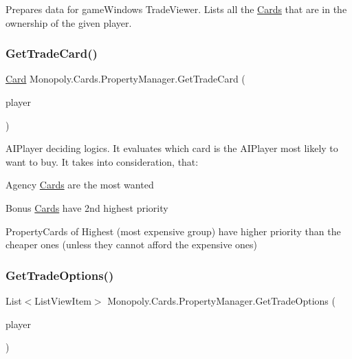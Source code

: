 Prepares data for game\+Window\textquotesingle{}s Trade\+Viewer. Lists all the \mbox{\hyperlink{namespace_monopoly_1_1_cards}{Cards}} that are in the ownership of the given player. \mbox{\label{class_monopoly_1_1_cards_1_1_property_manager_a412844ef7c911e8084dae7c3f71d37cc}} 
\subsubsection{\texorpdfstring{Get\+Trade\+Card()}{GetTradeCard()}}
{\footnotesize\ttfamily \mbox{\hyperlink{class_monopoly_1_1_cards_1_1_card}{Card}} Monopoly.\+Cards.\+Property\+Manager.\+Get\+Trade\+Card (\begin{DoxyParamCaption}\item[{\mbox{\hyperlink{class_monopoly_1_1_players_1_1_a_i_player}{A\+I\+Player}}}]{player }\end{DoxyParamCaption})\hspace{0.3cm}{\ttfamily [inline]}}

A\+I\+Player deciding logics. It evaluates which card is the A\+I\+Player most likely to want to buy. It takes into consideration, that\+:
\begin{DoxyItemize}
\item Agency \mbox{\hyperlink{namespace_monopoly_1_1_cards}{Cards}} are the most wanted
\item Bonus \mbox{\hyperlink{namespace_monopoly_1_1_cards}{Cards}} have 2nd highest priority
\item Property\+Cards of Highest (most expensive group) have higher priority than the cheaper ones (unless they cannot afford the expensive ones) 
\end{DoxyItemize}\mbox{\label{class_monopoly_1_1_cards_1_1_property_manager_a3e4394937f2067145c8b86addba32c4d}} 
\subsubsection{\texorpdfstring{Get\+Trade\+Options()}{GetTradeOptions()}}
{\footnotesize\ttfamily List$<$List\+View\+Item$>$ Monopoly.\+Cards.\+Property\+Manager.\+Get\+Trade\+Options (\begin{DoxyParamCaption}\item[{\mbox{\hyperlink{class_monopoly_1_1_players_1_1_player}{Player}}}]{player }\end{DoxyParamCaption})\hspace{0.3cm}{\ttfamily [inline]}}

